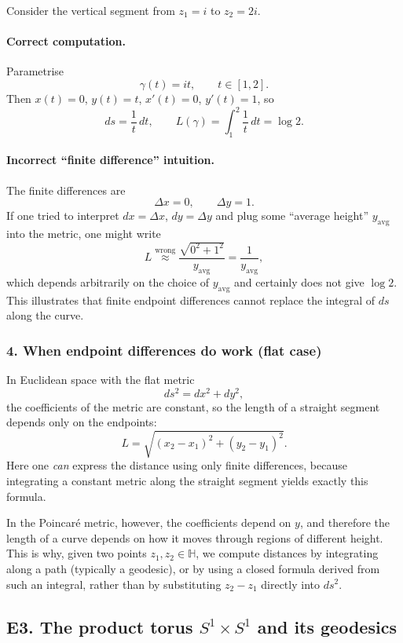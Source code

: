 \documentclass[12pt,a4paper]{article}
\theoremstyle{plain}
\theoremstyle{definition}      %
\begin{document}
Consider the vertical segment from $z_{1}=i$ to $z_{2}=2i$.

\paragraph{Correct computation.}
Parametrise
\[
\gamma(t) = it, \qquad t\in[1,2].
\]
Then $x(t)=0$, $y(t)=t$, $x'(t)=0$, $y'(t)=1$, so
\[
ds = \frac{1}{t}\,dt, \qquad
L(\gamma) = \int_{1}^{2} \frac{1}{t}\,dt = \log 2.
\]

\paragraph{Incorrect ``finite difference'' intuition.}
The finite differences are
\[
\Delta x = 0,\qquad \Delta y = 1.
\]
If one tried to interpret $dx=\Delta x$, $dy=\Delta y$ and plug some
``average height'' $y_{\text{avg}}$ into the metric, one might write
\[
L \stackrel{\text{wrong}}{\approx}
\frac{\sqrt{0^{2}+1^{2}}}{y_{\text{avg}}}
= \frac{1}{y_{\text{avg}}},
\]
which depends arbitrarily on the choice of $y_{\text{avg}}$ and certainly
does not give $\log 2$.  This illustrates that finite endpoint differences
cannot replace the integral of $ds$ along the curve.

\subsubsection*{4. When endpoint differences do work (flat case)}

In Euclidean space with the flat metric
\[
ds^{2} = dx^{2} + dy^{2},
\]
the coefficients of the metric are constant, so the length of a straight
segment depends only on the endpoints:
\[
L = \sqrt{(x_{2}-x_{1})^{2} + (y_{2}-y_{1})^{2}}.
\]
Here one \emph{can} express the distance using only finite differences,
because integrating a constant metric along the straight segment yields
exactly this formula.

In the Poincaré metric, however, the coefficients depend on $y$, and
therefore the length of a curve depends on how it moves through regions of
different height.  This is why, given two points $z_{1},z_{2}\in\mathbb H$,
we compute distances by integrating along a path (typically a geodesic), or
by using a closed formula derived from such an integral, rather than by
substituting $z_{2}-z_{1}$ directly into $ds^{2}$.

\subsection*{E3. The product torus $S^{1}\times S^{1}$ and its geodesics}
\end{document}
